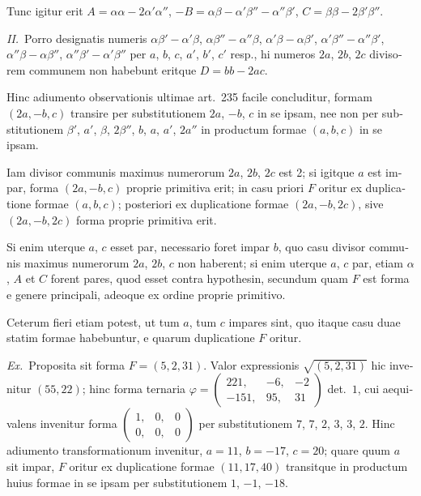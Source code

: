 \documentclass[12pt,a4paper]{article}
\theoremstyle{plain}
\theoremstyle{definition}
\theoremstyle{remark}
\begin{document}
\begin{otherlanguage}{latin}
Tunc igitur erit $A = \alpha\alpha - 2\alpha'\alpha''$, $-B = \alpha\beta - \alpha'\beta'' - \alpha''\beta'$, $C = \beta\beta - 2\beta'\beta''$.

\textit{II.}\ Porro designatis numeris $\alpha\beta' - \alpha'\beta$, $\alpha\beta'' - \alpha''\beta$, $\alpha'\beta - \alpha\beta'$, $\alpha'\beta'' - \alpha''\beta'$, $\alpha''\beta - \alpha\beta''$, $\alpha''\beta' - \alpha'\beta''$ per $a$, $b$, $c$, $a'$, $b'$, $c'$ resp., hi numeros $2a$, $2b$, $2c$ divisorem communem non habebunt eritque $D = bb - 2ac$.

Hinc adiumento observationis ultimae art.\ 235 facile concluditur, formam $(2a, -b, c)$ transire per substitutionem $2a$, $-b$, $c$ in se ipsam, nee non per substitutionem $\beta'$, $a'$, $\beta$, $2\beta''$, $b$, $a$, $a'$, $2a''$ in productum formae $(a, b, c)$ in se ipsam.

Iam divisor communis maximus numerorum $2a$, $2b$, $2c$ est 2; si igitque $a$ est impar, forma $(2a, -b, c)$ proprie primitiva erit; in casu priori $F$ oritur ex duplicatione formae $(a, b, c)$; posteriori ex duplicatione formae $(2a, -b, 2c)$, sive $(2a, -b, 2c)$ forma proprie primitiva erit.

Si enim uterque $a$, $c$ esset par, necessario foret impar $b$, quo casu divisor communis maximus numerorum $2a$, $2b$, $c$ non haberent; si enim uterque $a$, $c$ par, etiam $\alpha$, $A$ et $C$ forent pares, quod esset contra hypothesin, secundum quam $F$ est forma e genere principali, adeoque ex ordine proprie primitivo.

Ceterum fieri etiam potest, ut tum $a$, tum $c$ impares sint, quo itaque casu duae statim formae habebuntur, e quarum duplicatione $F$ oritur.

\textit{Ex.}\ Proposita sit forma $F = (5, 2, 31)$. Valor expressionis $\sqrt{(5, 2, 31)}$ hic invenitur $(55, 22)$; hinc forma ternaria $\varphi = \begin{pmatrix} 221, & -6, & -2 \\ -151, & 95, & 31 \end{pmatrix}$ det.\ $1$, cui aequivalens invenitur forma $\begin{pmatrix} 1, & 0, & 0 \\ 0, & 0, & 0 \end{pmatrix}$ per substitutionem $7$, $7$, $2$, $3$, $3$, $2$. Hinc adiumento transformationum invenitur, $a = 11$, $b = -17$, $c = 20$; quare quum $a$ sit impar, $F$ oritur ex duplicatione formae $(11, 17, 40)$ transitque in productum huius formae in se ipsam per substitutionem $1$, $-1$, $-18$.


\end{otherlanguage}
\end{document}
